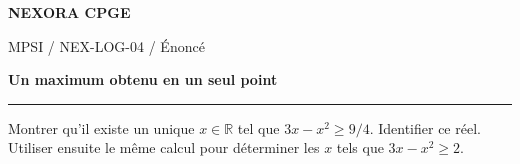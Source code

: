 \documentclass[11pt,a4paper]{article}
\begin{document}
{\small\bfseries\color{nexorablue} NEXORA CPGE}\par
{\small MPSI / NEX-LOG-04 / Énoncé}\par
{\LARGE\bfseries Un maximum obtenu en un seul point}\par
\vspace{0.25em}\hrule\vspace{0.6em}

Montrer qu’il existe un unique $x\in\mathbb R$ tel que $3x-x^2\ge9/4$. Identifier ce réel. Utiliser ensuite le même calcul pour déterminer les $x$ tels que $3x-x^2\ge2$.
\end{document}
